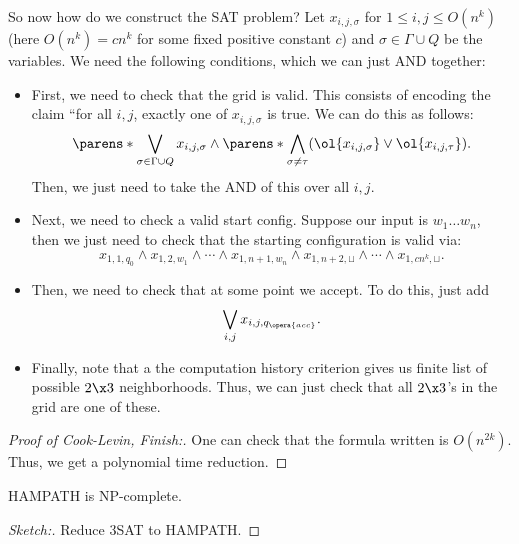 So now how do we construct the SAT problem?
Let $x_{i,j,\sigma}$ for $1\leq i, j \leq O(n^k)$ (here $O(n^k) = cn^k$ for some fixed positive constant $c$) and $\sigma\in \Gamma \cup Q$ be the variables. 
We need the following conditions, which we can just AND together:

\begin{itemize}
	\item First, we need to check that the grid is valid. This consists of encoding the claim ``for all $i,j$, exactly one of $x_{i,j,\sigma}$ is true. We can do this as follows: \[
			\parens*{\bigvee_{\sigma \in \Gamma \cup Q} x_{i,j,\sigma}} \land \parens*{\bigwedge_{\sigma\neq \tau} (\ol{x_{i,j,\sigma}} \lor \ol{x_{i,j,\tau}})}.
		\]
		Then, we just need to take the AND of this over all $i,j$.
	\item Next, we need to check a valid start config. Suppose our input is $w_1 \ldots w_n$, then we just need to check that the starting configuration is valid via:\[
			x_{1,1,q_0} \land x_{1,2,w_1} \land \cdots \land x_{1,n+1, w_n} \land x_{1,n+2, \sqcup} \land \cdots \land x_{1,cn^k, \sqcup}.
		\]
	\item Then, we need to check that at some point we accept. To do this, just add \[
			\bigvee_{i,j} x_{i,j,q_{\opera{acc}}}.
		\]
	\item Finally, note that a the computation history criterion gives us finite list of possible $2\x 3$ neighborhoods.
		Thus, we can just check that all $2\x3$'s in the grid are one of these.
\end{itemize}

\begin{proof}
	[Proof of Cook-Levin, Finish:]
	One can check that the formula written is $O(n^{2k})$.
	Thus, we get a polynomial time reduction.
\end{proof}

\begin{cor}
	HAMPATH is NP-complete.
\end{cor}

\begin{proof}
	[Sketch:] Reduce 3SAT to HAMPATH.
\end{proof}
